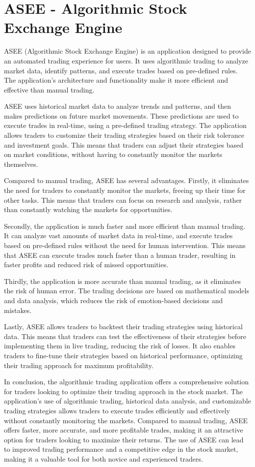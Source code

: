 \section{ASEE - Algorithmic Stock Exchange Engine}
ASEE (Algorithmic Stock Exchange Engine) is an application designed to provide an automated trading experience for users. It uses algorithmic trading to analyze market data, identify patterns, and execute trades based on pre-defined rules. The application's architecture and functionality make it more efficient and effective than manual trading.

ASEE uses historical market data to analyze trends and patterns, and then makes predictions on future market movements. These predictions are used to execute trades in real-time, using a pre-defined trading strategy. The application allows traders to customize their trading strategies based on their risk tolerance and investment goals. This means that traders can adjust their strategies based on market conditions, without having to constantly monitor the markets themselves.

Compared to manual trading, ASEE has several advantages. Firstly, it eliminates the need for traders to constantly monitor the markets, freeing up their time for other tasks. This means that traders can focus on research and analysis, rather than constantly watching the markets for opportunities.

Secondly, the application is much faster and more efficient than manual trading. It can analyze vast amounts of market data in real-time, and execute trades based on pre-defined rules without the need for human intervention. This means that ASEE can execute trades much faster than a human trader, resulting in faster profits and reduced risk of missed opportunities.

Thirdly, the application is more accurate than manual trading, as it eliminates the risk of human error. The trading decisions are based on mathematical models and data analysis, which reduces the risk of emotion-based decisions and mistakes.

Lastly, ASEE allows traders to backtest their trading strategies using historical data. This means that traders can test the effectiveness of their strategies before implementing them in live trading, reducing the risk of losses. It also enables traders to fine-tune their strategies based on historical performance, optimizing their trading approach for maximum profitability.

In conclusion, the algorithmic trading application offers a comprehensive solution for traders looking to optimize their trading approach in the stock market. The application's use of algorithmic trading, historical data analysis, and customizable trading strategies allows traders to execute trades efficiently and effectively without constantly monitoring the markets. Compared to manual trading, ASEE offers faster, more accurate, and more profitable trades, making it an attractive option for traders looking to maximize their returns. The use of ASEE can lead to improved trading performance and a competitive edge in the stock market, making it a valuable tool for both novice and experienced traders.


